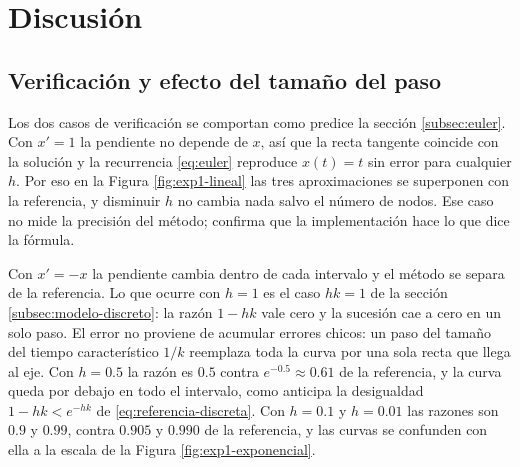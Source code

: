 \section{Discusión}
\label{sec:discusion}

\subsection{Verificación y efecto del tamaño del paso}
\label{subsec:dis-verificacion}

Los dos casos de verificación se comportan como predice la sección \ref{subsec:euler}. Con
$x' = 1$ la pendiente no depende de $x$, así que la recta tangente coincide con la solución y la
recurrencia \eqref{eq:euler} reproduce $x(t) = t$ sin error para cualquier $h$. Por eso en la
Figura \ref{fig:exp1-lineal} las tres aproximaciones se superponen con la referencia, y
disminuir $h$ no cambia nada salvo el número de nodos. Ese caso no mide la precisión del
método; confirma que la implementación hace lo que dice la fórmula.

Con $x' = -x$ la pendiente cambia dentro de cada intervalo y el método se separa de la
referencia. Lo que ocurre con $h = 1$ es el caso $hk = 1$ de la sección
\ref{subsec:modelo-discreto}: la razón $1 - hk$ vale cero y la sucesión cae a cero en un solo
paso. El error no proviene de acumular errores chicos: un paso del tamaño del tiempo
característico $1/k$ reemplaza toda la curva por una sola recta que llega al eje. Con $h = 0.5$ la razón es $0.5$ contra $e^{-0.5} \approx 0.61$ de la referencia, y la
curva queda por debajo en todo el intervalo, como anticipa la desigualdad
$1 - hk < e^{-hk}$ de \eqref{eq:referencia-discreta}. Con $h = 0.1$ y $h = 0.01$ las razones son
$0.9$ y $0.99$, contra $0.905$ y $0.990$ de la referencia, y las curvas se confunden con ella a
la escala de la Figura \ref{fig:exp1-exponencial}.

